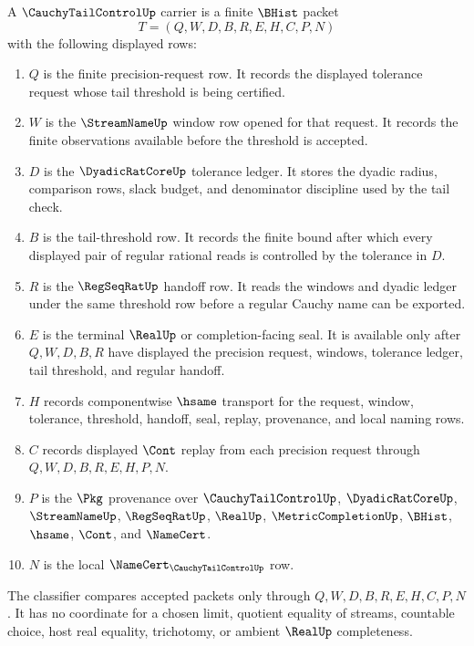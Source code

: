 \begin{definition}
\label{def:cauchy-tail-control-carrier}
A $\CauchyTailControlUp$ carrier is a finite $\BHist$ packet
$$
T=(Q,W,D,B,R,E,H,C,P,N)
$$
with the following displayed rows:
\begin{enumerate}
\item $Q$ is the finite precision-request row. It records the displayed tolerance request whose tail threshold is being certified.
\item $W$ is the $\StreamNameUp$ window row opened for that request. It records the finite observations available before the threshold is accepted.
\item $D$ is the $\DyadicRatCoreUp$ tolerance ledger. It stores the dyadic radius, comparison rows, slack budget, and denominator discipline used by the tail check.
\item $B$ is the tail-threshold row. It records the finite bound after which every displayed pair of regular rational reads is controlled by the tolerance in $D$.
\item $R$ is the $\RegSeqRatUp$ handoff row. It reads the windows and dyadic ledger under the same threshold row before a regular Cauchy name can be exported.
\item $E$ is the terminal $\RealUp$ or completion-facing seal. It is available only after $Q,W,D,B,R$ have displayed the precision request, windows, tolerance ledger, tail threshold, and regular handoff.
\item $H$ records componentwise $\hsame$ transport for the request, window, tolerance, threshold, handoff, seal, replay, provenance, and local naming rows.
\item $C$ records displayed $\Cont$ replay from each precision request through $Q,W,D,B,R,E,H,P,N$.
\item $P$ is the $\Pkg$ provenance over $\CauchyTailControlUp$, $\DyadicRatCoreUp$, $\StreamNameUp$, $\RegSeqRatUp$, $\RealUp$, $\MetricCompletionUp$, $\BHist$, $\hsame$, $\Cont$, and $\NameCert$.
\item $N$ is the local $\NameCert_{\CauchyTailControlUp}$ row.
\end{enumerate}
The classifier compares accepted packets only through $Q,W,D,B,R,E,H,C,P,N$. It has no coordinate for a chosen limit, quotient equality of streams, countable choice, host real equality, trichotomy, or ambient $\RealUp$ completeness.
\end{definition}

